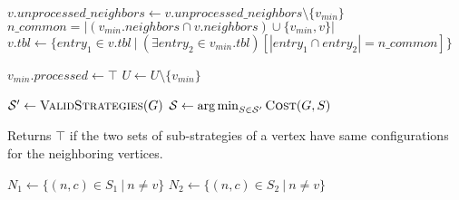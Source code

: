 \documentclass{article}
\newcommand{\strategy}{\ensuremath{\mathcal{S}}}
\DeclareMathOperator*{\argmin}{arg\,min}
\newcommand{\set}[1]{\{#1\}}
\begin{document}
\begin{algorithm}
\begin{algorithmic}[1]
			\State $v.unprocessed\_neighbors \leftarrow
			v.unprocessed\_neighbors\setminus \set{v_{min}}$
			\State $n\_common = |(v_{min}.neighbors \cap v.neighbors) \cup
			\set{v_{min}, v}|$
			\State $v.tbl \leftarrow \set{entry_1\in v.tbl ~|~ (\exists
			entry_2 \in v_{min}.tbl)[|entry_1 \cap entry_2| = n\_common]}$
		\EndFor

		\Statex
		\State $v_{min}.processed \leftarrow \top$
		\State $U \leftarrow U\setminus \set{v_{min}}$
	\EndWhile
	\Statex

	\State $\strategy' \leftarrow \Call{ValidStrategies}{G}$ 
	\State $\strategy \leftarrow \argmin_{S\in \strategy'} \Call{Cost}{G, S}$
	\State \Return{\strategy}

	\EndProcedure
\end{algorithmic}

\end{algorithm}

\begin{algorithm}
	\caption{\label{alg:is-compatible}Returns $\top$ if the two
	sets of sub-strategies of a vertex have same configurations for the
	neighboring vertices.}

	\begin{algorithmic}[1]
					\State $N_1 \leftarrow \set{(n,c)\in S_1~|~n \not= v}$
					\State $N_2 \leftarrow \set{(n,c)\in S_2~|~n \not= v}$
					\Statex

						\State \Return{$\bot$}
					\EndIf
				\EndFor
			\EndFor
			\Statex
			\State \Return{$\top$}
		\EndProcedure
	\end{algorithmic}
\end{algorithm}
\end{document}
